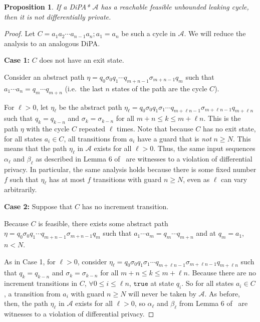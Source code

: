 \documentclass[12pt]{article}
\newtheorem{prop}[thm]{Proposition}
\theoremstyle{definition}
\begin{document}
\begin{prop} If a DiPA* $\mathcal{A}$ has a reachable feasible unbounded leaking cycle, then it is not differentially private.
\end{prop}

\begin{proof} 

Let $C = a_1a_2\cdots a_{n-1}a_n; a_1=a_n$ be such a cycle in $\mathcal{A}$. We will reduce the analysis to an analogous DiPA.\@

\textbf{Case 1:} $C$ does not have an exit state.

Consider an abstract path $\eta = q_0\sigma_0q_1\cdots q_{m+n-1}\sigma_{m+n-1}q_m$ such that $a_1\cdots a_n=q_m\cdots q_{m+n}$ (i.e.\ the last $n$ states of the path are the cycle $C$). 

For $\ell > 0$, let $\eta_\ell$ be the abstract path $\eta_\ell = q_0\sigma_0q_1\sigma_1\cdots q_{m+\ell n-1}\sigma_{m+\ell n-1}q_{m+\ell n}$ such that $q_k = q_{k-n}$ and $\sigma_k = \sigma_{k-n}$ for all $m+n\leq k\leq m + \ell n$. This is the path $\eta$ with the cycle $C$ repeated $\ell$ times. 
Note that because $C$ has no exit state, for all states $a_i\in C$, all transitions from $a_i$ have a guard that is \textit{not} $n\geq N$. This means that the path $\eta_\ell$ in $\mathcal{A}$ exists for all $\ell>0$. 
Thus, the same input sequences $\alpha_\ell$ and $\beta_\ell$ as described in Lemma 6 of~\cite{chadhaLinearTimeDecidability2021} are witnesses to a violation of differential privacy. In particular, the same analysis holds because there is some fixed number $f$ such that $\eta_\ell$ has at most $f$ transitions with guard $n\geq N$, even as $\ell$ can vary arbitrarily.

\textbf{Case 2:} Suppose that $C$ has no increment transition.

Because $C$ is feasible, there exists some abstract path $\eta = q_0\sigma_0q_1\cdots q_{m+n-1}\sigma_{m+n-1}q_m$ such that $a_1\cdots a_m = q_m\cdots q_{m+n}$ and at $q_m = a_1$, $n < N$.

As in Case 1, for $\ell > 0$, consider $\eta_\ell = q_0\sigma_0q_1\sigma_1\cdots q_{m+\ell n-1}\sigma_{m+\ell n-1}q_{m+\ell n}$ such that $q_k = q_{k-n}$ and $\sigma_k = \sigma_{k-n}$ for all $m+n\leq k\leq m + \ell n$. 
Because there are no increment transitions in $C$, $\forall 0\leq i\leq \ell n$, $\texttt{true}$ at state $q_i$. So for all states $a_i\in C$, a transition from $a_i$ with guard $n\geq N$ will never be taken by $\mathcal{A}$. As before, then, the path $\eta_\ell$ in $\mathcal{A}$ exists for all $\ell > 0$, so $\alpha_\ell$ and $\beta_\ell$ from Lemma 6 of~\cite{chadhaLinearTimeDecidability2021} are witnesses to a violation of differential privacy.

\end{proof}
\end{document}
